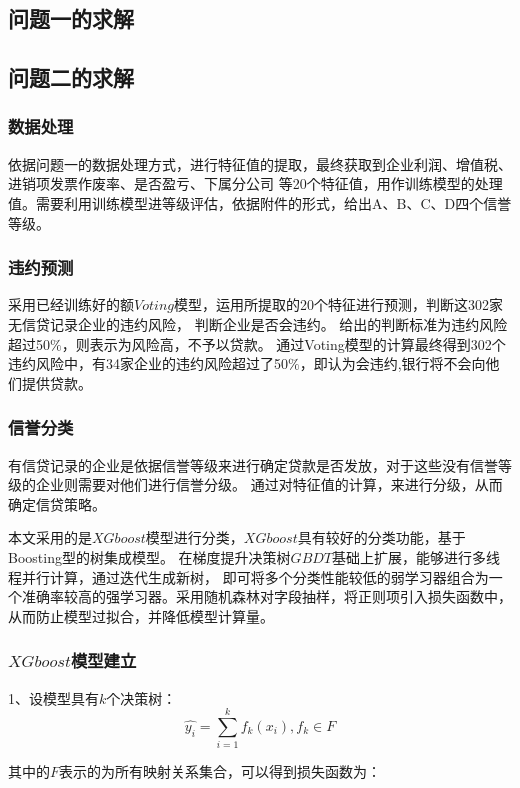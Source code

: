 \documentclass[UTF8]{ctexart}
\begin{document}
\subsection{问题一的求解}



\subsection{问题二的求解}
	\subsubsection{数据处理}
	依据问题一的数据处理方式，进行特征值的提取，最终获取到企业利润、增值税、进销项发票作废率、是否盈亏、下属分公司
	等20个特征值，用作训练模型的处理值。需要利用训练模型进等级评估，依据附件的形式，给出A、B、C、D四个信誉等级。
	\subsubsection{违约预测}
	采用已经训练好的额$Voting$模型，运用所提取的20个特征进行预测，判断这302家无信贷记录企业的违约风险，
	判断企业是否会违约。 给出的判断标准为违约风险超过50$\%$，则表示为风险高，不予以贷款。
	通过Voting模型的计算最终得到302个违约风险中，有34家企业的违约风险超过了50$\%$，即认为会违约,银行将不会向他们提供贷款。
	\subsubsection{信誉分类}
	有信贷记录的企业是依据信誉等级来进行确定贷款是否发放，对于这些没有信誉等级的企业则需要对他们进行信誉分级。
	通过对特征值的计算，来进行分级，从而确定信贷策略。

	本文采用的是$XGboost$模型进行分类，$XGboost$具有较好的分类功能，基于Boosting型的树集成模型。
	在梯度提升决策树$GBDT$基础上扩展，能够进行多线程并行计算，通过迭代生成新树，
	即可将多个分类性能较低的弱学习器组合为一个准确率较高的强学习器。采用随机森林对字段抽样，将正则项引入损失函数中，
	从而防止模型过拟合，并降低模型计算量。

	\subsubsection{$XGboost$模型建立}
	1、设模型具有$k$个决策树：
		\begin{equation}
			\hat{y_i}=\sum_{i = 1}^{k}f_k(x_i),f_k \in F    
		\end{equation}

		其中的$F$表示的为所有映射关系集合，可以得到损失函数为：
\end{document}
